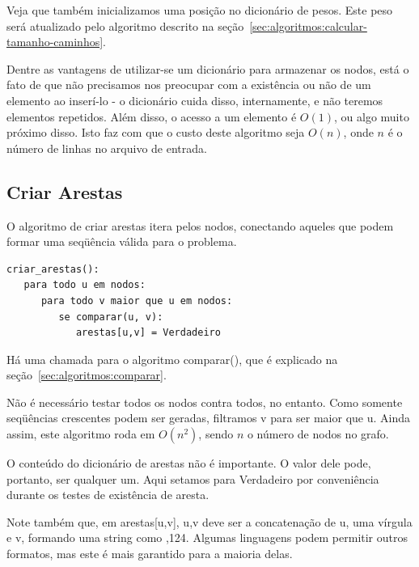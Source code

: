 \documentclass[12pt]{article}
\begin{document}
Veja que também inicializamos uma posi\c{c}ão no dicionário de pesos. Este peso será atualizado pelo algoritmo descrito na se\c{c}ão~\ref{sec:algoritmos:calcular-tamanho-caminhos}.

Dentre as vantagens de utilizar-se um dicionário para armazenar os nodos, está o fato de que não precisamos nos preocupar com a existência ou não de um elemento ao inserí-lo - o dicionário cuida disso, internamente, e não teremos elementos repetidos. Além disso, o acesso a um elemento é $O(1)$, ou algo muito próximo disso. Isto faz com que o custo deste algoritmo seja $O(n)$, onde $n$ é o número de linhas no arquivo de entrada. %

\subsection{Criar Arestas}\label{sec:algoritmos:criar-arestas}
O algoritmo de criar arestas itera pelos nodos, conectando aqueles que podem formar uma seqüência válida para o problema.

\begin{lstlisting}
criar_arestas():
   para todo u em nodos:
      para todo v maior que u em nodos:
         se comparar(u, v):
            arestas[u,v] = Verdadeiro
\end{lstlisting}

Há uma chamada para o algoritmo {\sf comparar()}, que é explicado na se\c{c}ão~\ref{sec:algoritmos:comparar}.

Não é necessário testar todos os nodos contra todos, no entanto. Como somente seqüências crescentes podem ser geradas, filtramos {\sf v} para ser maior que {\sf u}. Ainda assim, este algoritmo roda em $O(n^2)$, sendo $n$ o número de nodos no grafo.

O conteúdo do dicionário de arestas não é importante. O valor dele pode, portanto, ser qualquer um. Aqui setamos para {\sf Verdadeiro} por conveniência durante os testes de existência de aresta.

Note também que, em {\sf arestas[u,v]}, {\sf u,v} deve ser a concatena\c{c}ão de {\sf u}, uma vírgula e {\sf v}, formando uma string como {,124}. Algumas linguagens podem permitir outros formatos, mas este é mais garantido para a maioria delas.
\end{document}
